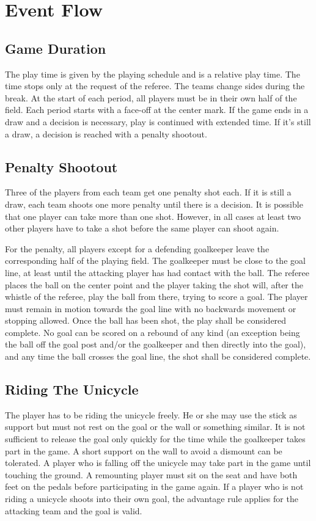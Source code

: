 \section{Event Flow}

\subsection{Game Duration}

The play time is given by the playing schedule and is a relative play time.
The time stops only at the request of the referee.
The teams change sides during the break.
At the start of each period, all players must be in their own half of the field.
Each period starts with a face-off at the center mark.
If the game ends in a draw and a decision is necessary, play is continued with extended time.
If it's still a draw, a decision is reached with a penalty shootout.

\subsection{Penalty Shootout}
Three of the players from each team get one penalty shot each.
If it is still a draw, each team shoots one more penalty until there is a decision.
It is possible that one player can take more than one shot.
However, in all cases at least two other players have to take a shot before the same player can shoot again.

For the penalty, all players except for a defending goalkeeper leave the corresponding half of the playing field.
The goalkeeper must be close to the goal line, at least until the attacking player has had contact with the ball.
The referee places the ball on the center point and the player taking the shot will, after the whistle of the referee, play the ball from there, trying to score a goal.
The player must remain in motion towards the goal line with no backwards movement or stopping allowed.
Once the ball has been shot, the play shall be considered complete.
No goal can be scored on a rebound of any kind (an exception being the ball off the goal post and/or the goalkeeper and then directly into the goal), and any time the ball crosses the goal line, the shot shall be considered complete.

\subsection{Riding The Unicycle}
The player has to be riding the unicycle freely.
He or she may use the stick as support but must not rest on the goal or the wall or something similar.
It is not sufficient to release the goal only quickly for the time while the goalkeeper takes part in the game.
A short support on the wall to avoid a dismount can be tolerated.
A player who is falling off the unicycle may take part in the game until touching the ground.
A remounting player must sit on the seat and have both feet on the pedals before participating in the game again.
If a player who is not riding a unicycle shoots into their own goal, the advantage rule applies for the attacking team and the goal is valid.

